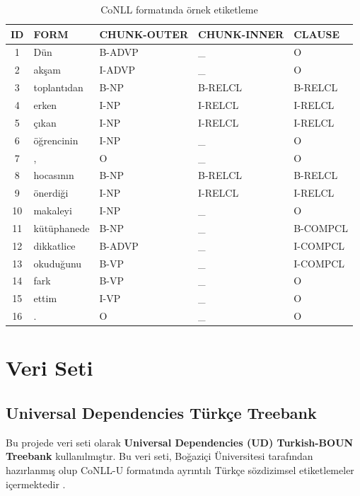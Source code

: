\documentclass[12pt,a4paper]{article}
\begin{document}
\begin{table}[H]
\centering
\caption{CoNLL formatında örnek etiketleme}
\begin{tabular}{cllll}
\toprule
\textbf{ID} & \textbf{FORM} & \textbf{CHUNK-OUTER} & \textbf{CHUNK-INNER} & \textbf{CLAUSE} \\
\midrule
1  & Dün         & B-ADVP & \_ & O \\
2  & akşam       & I-ADVP & \_ & O \\
3  & toplantıdan & B-NP   & B-RELCL & B-RELCL \\
4  & erken       & I-NP   & I-RELCL & I-RELCL \\
5  & çıkan       & I-NP   & I-RELCL & I-RELCL \\
6  & öğrencinin  & I-NP   & \_ & O \\
7  & ,           & O      & \_ & O \\
8  & hocasının   & B-NP   & B-RELCL & B-RELCL \\
9  & önerdiği    & I-NP   & I-RELCL & I-RELCL \\
10 & makaleyi    & I-NP   & \_ & O \\
11 & kütüphanede & B-NP   & \_ & B-COMPCL \\
12 & dikkatlice  & B-ADVP & \_ & I-COMPCL \\
13 & okuduğunu   & B-VP   & \_ & I-COMPCL \\
14 & fark        & B-VP   & \_ & O \\
15 & ettim       & I-VP   & \_ & O \\
16 & .           & O      & \_ & O \\
\bottomrule
\end{tabular}
\end{table}

\section{Veri Seti}

\subsection{Universal Dependencies Türkçe Treebank}

Bu projede veri seti olarak \textbf{Universal Dependencies (UD) Turkish-BOUN Treebank}
kullanılmıştır. Bu veri seti, Boğaziçi Üniversitesi tarafından hazırlanmış olup
CoNLL-U formatında ayrıntılı Türkçe sözdizimsel etiketlemeler içermektedir
\cite{ud_turkish}.
\end{document}
